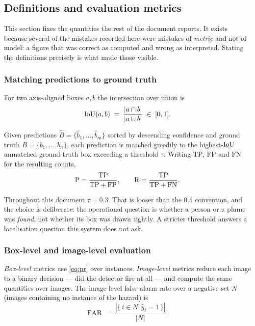 \subsection{Definitions and evaluation metrics}
\label{sec:metrics}

This section fixes the quantities the rest of the document reports. It exists
because several of the mistakes recorded here were mistakes of \emph{metric}
and not of model: a figure that was correct as computed and wrong as
interpreted. Stating the definitions precisely is what made those visible.

\subsubsection{Matching predictions to ground truth}

For two axis-aligned boxes $a, b$ the intersection over union is
\begin{equation}
  \operatorname{IoU}(a,b) \;=\; \frac{|a \cap b|}{|a \cup b|} \;\in\; [0,1].
  \label{eq:iou}
\end{equation}

Given predictions $\hat{B} = \{\hat{b}_1, \dots, \hat{b}_m\}$ sorted by
descending confidence and ground truth $B = \{b_1, \dots, b_n\}$, each
prediction is matched greedily to the highest-$\operatorname{IoU}$ unmatched ground-truth
box exceeding a threshold $\tau$. Writing $\mathrm{TP}$, $\mathrm{FP}$ and
$\mathrm{FN}$ for the resulting counts,
\begin{equation}
  \operatorname{P} = \frac{\mathrm{TP}}{\mathrm{TP} + \mathrm{FP}}, \qquad
  \operatorname{R} = \frac{\mathrm{TP}}{\mathrm{TP} + \mathrm{FN}}.
  \label{eq:pr}
\end{equation}

Throughout this document $\tau = 0.3$. That is looser than the $0.5$
convention, and the choice is deliberate: the operational question is whether
a person or a plume was \emph{found}, not whether its box was drawn tightly.
A stricter threshold answers a localisation question this system does not ask.

\subsubsection{Box-level and image-level evaluation}
\label{sec:twolevels}

\emph{Box-level} metrics use \cref{eq:pr} over instances. \emph{Image-level}
metrics reduce each image to a binary decision — did the detector fire at all
— and compute the same quantities over images. The image-level false-alarm
rate over a negative set $N$ (images containing no instance of the hazard) is
\begin{equation}
  \mathrm{FAR} \;=\; \frac{|\{\, i \in N : \hat{y}_i = 1 \,\}|}{|N|}.
  \label{eq:far}
\end{equation}

